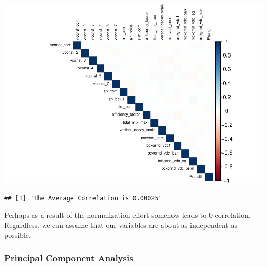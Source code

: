 \documentclass[
  11pt,
]{article}
\newenvironment{Shaded}{\begin{snugshade}}{\end{snugshade}}
\newcommand{\DataTypeTok}[1]{\textcolor[rgb]{0.13,0.29,0.53}{#1}}
\newcommand{\DecValTok}[1]{\textcolor[rgb]{0.00,0.00,0.81}{#1}}
\newcommand{\KeywordTok}[1]{\textcolor[rgb]{0.13,0.29,0.53}{\textbf{#1}}}
\newcommand{\NormalTok}[1]{#1}
\newcommand{\OperatorTok}[1]{\textcolor[rgb]{0.81,0.36,0.00}{\textbf{#1}}}
\newcommand{\OtherTok}[1]{\textcolor[rgb]{0.56,0.35,0.01}{#1}}
\newcommand{\StringTok}[1]{\textcolor[rgb]{0.31,0.60,0.02}{#1}}
\begin{document}
\includegraphics{Project-5-MTW_files/figure-latex/unnamed-chunk-3-1.pdf}

\begin{Shaded}
\end{Shaded}

\begin{verbatim}
## [1] "The Average Correlation is 0.00025"
\end{verbatim}

Perhaps as a result of the normalization effort somehow leads to 0
correlation. Regardless, we can assume that our variables are about as
independent as possible.

\hypertarget{principal-component-analysis}{%
\subsubsection{Principal Component
Analysis}\label{principal-component-analysis}}

\begin{Shaded}
\end{Shaded}
\end{document}
